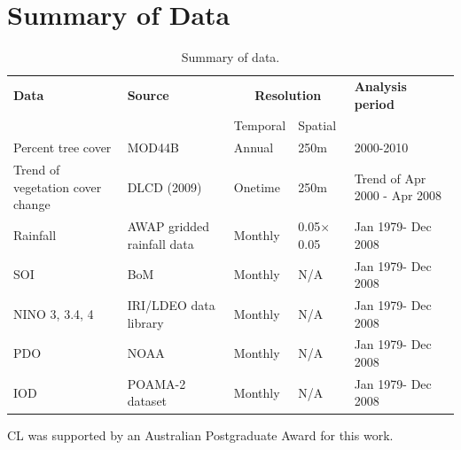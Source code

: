 \documentclass[draft,linenumbers]{agujournal}
\begin{document}
\appendix

\section{Summary of Data}

 \begin{table}
 \caption{Summary of data.}
  \label{tab:ch3Data}
 \begin{tabular}{lllll}
  \hline
  \textbf{Data} & \textbf{Source} & \multicolumn{2}{c}{\textbf{Resolution}} & \textbf{Analysis period} \\\cline{3-4}
  & & Temporal & Spatial & \\\hline
  Percent tree cover & MOD44B & Annual &	250m & 2000-2010\\
  Trend of vegetation cover change  &	DLCD (2009)	& Onetime & 250m	& Trend of Apr 2000 - Apr 2008\\
  Rainfall &	AWAP gridded rainfall data &	Monthly &	0.05\textdegree$\times$0.05\textdegree & Jan 1979- Dec 2008\\
  SOI	& BoM	& Monthly &	N/A &	Jan 1979- Dec 2008\\
  NINO 3, 3.4, 4 &	IRI/LDEO data library	& Monthly	& N/A	& Jan 1979- Dec 2008\\
  PDO	& NOAA & Monthly	& N/A	& Jan 1979- Dec 2008\\
  IOD	& POAMA-2 dataset	& Monthly	& N/A	& Jan 1979- Dec 2008\\
  \hline
  \end{tabular}
\end{table}

\newpage
\begin{acknowledgments}
CL was supported by an Australian Postgraduate Award for this work.
\end{acknowledgments}


%

\end{document}
